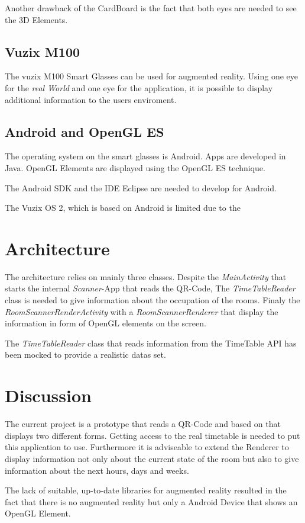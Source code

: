 \documentclass[11pt]{scrartcl}
\begin{document}
\begin{multicols}{2}
			Another drawback of the CardBoard is the fact that both eyes are needed to see the 3D Elements.   
		
		\subsection{Vuzix M100}
			The vuzix M100 Smart Glasses can be used for augmented reality. Using one eye for the \emph{real World} and one eye for the application, it is possible to display additional information to the users enviroment.
		
		\subsection{Android and OpenGL ES}
			The operating system on the smart glasses is Android. Apps are developed in Java. OpenGL Elements are displayed using the OpenGL ES technique.
	
			The Android SDK and the IDE Eclipse are needed to develop for Android.
			
			The Vuzix OS 2, which is based on Android is limited due to the 
	\section{Architecture}
		The architecture relies on mainly three classes. Despite the \emph{MainActivity} that starts the internal \emph{Scanner}-App that reads the QR-Code, The \emph{TimeTableReader} class is needed to give information about the occupation of the rooms. Finaly the \emph{RoomScannerRenderActivity} with a \emph{RoomScannerRenderer} that display the information in form of OpenGL elements on the screen.
		
		The \emph{TimeTableReader} class that reads information from the TimeTable API has been mocked to provide a realistic datas set. 
	
	\section{Discussion}
		The current project is a prototype that reads a QR-Code and based on that displays two different forms. Getting access to the real timetable is needed to put this application to use. Furthermore it is adviseable to extend the Renderer to display information not only about the current state of the room but also to give information about the next hours, days and weeks.
		
		The lack of suitable, up-to-date libraries for augmented reality resulted in the fact that there is no augmented reality but only a Android Device that shows an \linebreak OpenGL Element.  


\end{multicols}
\end{document}
